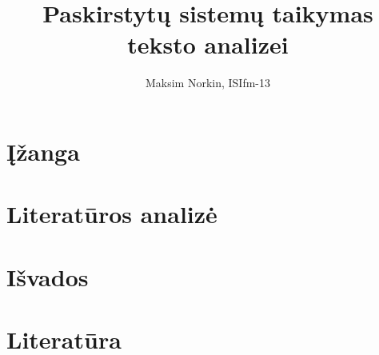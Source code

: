 \documentclass{IEEEtran}
\author{Maksim Norkin, ISIfm-13}
\title{Paskirstytų sistemų taikymas teksto analizei}
\begin{document}
	\section{Įžanga}

	\section{Literatūros analizė}

	\section{Išvados}

	\newpage

	\section{Literatūra}
\end{document}
